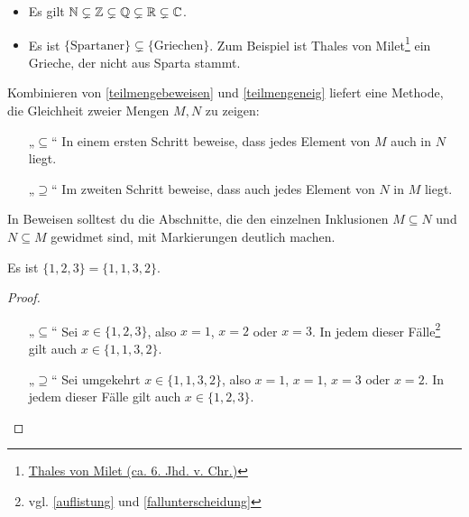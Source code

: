 \begin{bsp} \quad
    \begin{itemize}
        \item Es gilt $\mathbb N\subsetneq\mathbb Z\subsetneq\mathbb Q\subsetneq\mathbb R\subsetneq\mathbb C$.
        \item Es ist $\{\text{Spartaner}\}\subsetneq \{\text{Griechen}\}$. Zum Beispiel ist Thales von Milet\footnote{\href{https://de.wikipedia.org/wiki/Thales}{Thales von Milet (ca. 6. Jhd. v. Chr.)}} ein Grieche, der nicht aus Sparta stammt.
    \end{itemize}
\end{bsp}


\begin{bem} \label{mengengleichbeweis}
    Kombinieren von \cref{teilmengebeweisen} und \cref{teilmengeneig} liefert eine Methode, die Gleichheit zweier Mengen $M,N$ zu zeigen:
    \begin{itemize}
        \item[„$\subseteq$“] In einem ersten Schritt beweise, dass jedes Element von $M$ auch in $N$ liegt.
        \item[„$\supseteq$“] Im zweiten Schritt beweise, dass auch jedes Element von $N$ in $M$ liegt.
    \end{itemize}
    In Beweisen solltest du die Abschnitte, die den einzelnen Inklusionen $M\subseteq N$ und $N\subseteq M$ gewidmet sind, mit Markierungen deutlich machen.
\end{bem}


\begin{bsp} \label{bsp:mengengleichbeweis}
    Es ist $\{1,2,3\}=\{1,1,3,2\}$.
\end{bsp}
\begin{proof}
    \begin{itemize}
        \item[„$\subseteq$“] Sei $x\in\{1,2,3\}$, also $x=1$, $x=2$ oder $x=3$. In jedem dieser Fälle\footnote{vgl. \cref{auflistung} und \cref{fallunterscheidung}} gilt auch $x\in\{1,1,3,2\}$.
        \item[„$\supseteq$“] Sei umgekehrt $x\in\{1,1,3,2\}$,  also $x=1$, $x=1$, $x=3$ oder $x=2$. In jedem dieser Fälle gilt auch $x\in\{1,2,3\}$. \qedhere
    \end{itemize}
\end{proof}


